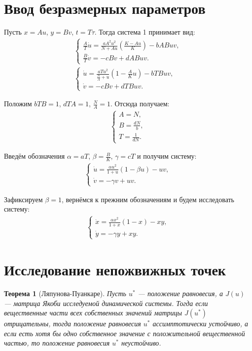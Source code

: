 \documentclass[11pt]{article}
\newtheorem{theorem}{Теорема}
\begin{document}
\section{Ввод безразмерных параметров}

Пусть $x = Au$, $y = Bv$, $t = T\tau$. Тогда система 1 принимает вид:
\begin{gather}
\left\{ \begin{aligned}
\frac{A}{T}\dot{u} = \frac{aA^2u^2}{N + Au}\left( \frac{K - Au}{K} \right) - bABuv, \\
\frac{B}{T}\dot{v} = -cBv + dABuv.
\end{aligned} \right. \\ %
\left\{ \begin{aligned}
\dot{u} = \frac{aTu^2}{\frac{N}{A} + u}\left( 1 - \frac{A}{K}u \right) - bTBuv, \\
\dot{v} = -cBv + dTBuv.
\end{aligned} \right. %
\end{gather}

Положим $bTB = 1$, $dTA = 1$, $\frac{N}{A} = 1$. Отсюда получаем:
\begin{gather}
\left\{ \begin{aligned}
A = N, \\
B = \frac{dN}{b}, \\
T = \frac{1}{dN}.
\end{aligned} \right.
\end{gather}

Введём обозначения $\alpha = aT$, $\beta = \frac{B}{K}$, $\gamma = cT$ и получим систему:
\begin{gather}
\left\{ \begin{aligned}
\dot{u} = \frac{\alpha u^2}{1 + u}(1 - \beta u) - uv, \\
\dot{v} = -\gamma v + uv.
\end{aligned} \right.
\end{gather}

Зафиксируем $\beta = 1$, вернёмся к прежним обозначениям и будем исследовать систему:
\begin{gather}
\left\{ \begin{aligned}
\dot{x} = \frac{\alpha x^2}{1 + x}(1 - x) - xy, \\
\dot{y} = -\gamma y + xy.
\end{aligned} \right.
\end{gather}

\section{Исследование непожвижных точек}
\begin{theorem}[Ляпунова-Пуанкаре]
Пусть $u^*$ --- положение равновесия, а $J(u)$ --- матрица Якоби исследуемой динамической системы. Тогда если вещественные части всех собственных значений матрицы $J(u^*)$ отрицательны, тогда положение равновесия $u^*$ ассимптотически устойчиво, а если есть хотя бы одно собственное значение с положительной вещественной частью, то положение равновесия $u^*$ неустойчиво.
\end{theorem}
\end{document}
